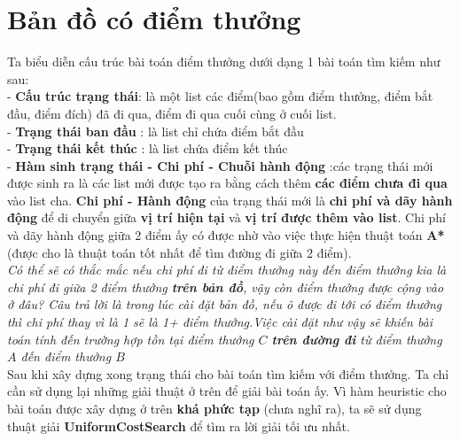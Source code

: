 \documentclass[11pt]{article} %
\begin{document}
\section{Bản đồ có điểm thưởng}
Ta biểu diễn cấu trúc bài toán điểm thưởng dưới dạng 1 bài toán tìm kiếm như sau:\\
- \textbf{Cấu trúc trạng thái}: là một list các điểm(bao gồm điểm thưởng, điểm bắt đầu, điểm đích) đã đi qua, điểm đi qua cuối cùng ở cuối list. \\
- \textbf{Trạng thái ban đầu} : là  list chỉ chứa điểm bắt đầu\\
- \textbf{Trạng thái kết thúc} : là list chứa điểm kết thúc\\
- \textbf{Hàm sinh trạng thái - Chi phí - Chuỗi hành động} :các trạng thái mới được sinh ra là các list mới được tạo ra bằng cách thêm \textbf{các điểm chưa đi qua} vào list cha. \textbf{Chi phí - Hành động} của trạng thái mới là \textbf{chi phí và dãy hành động} để di chuyển giữa \textbf{vị trí hiện tại} và \textbf{vị trí được thêm vào list}. Chi phí và dãy hành động giữa 2 điểm ấy có được nhờ vào việc thực hiện thuật toán \textbf{A*} (được cho là thuật toán tốt nhất để tìm đường đi giữa 2 điểm).\\
\emph{Có thể sẽ có thắc mắc nếu chi phí đi từ điểm thưởng này đến điểm thưởng kia là chi phí đi giữa 2 điểm thưởng \textbf{trên bản đồ}, vậy còn điểm thưởng được cộng vào ở đâu? Câu trả lời là trong lúc cài đặt bản đồ, nếu ô được đi tới có điểm thưởng thì chi phí thay vì là 1 sẽ là 1+ điểm thưởng.Việc cài đặt như vậy sẽ khiến bài toán tính đến trường hợp tồn tại điểm thưởng $C$ \textbf{trên đường đi} từ điểm thưởng $A$ đến điểm thưởng $B$}\\
Sau khi xây dựng xong trạng thái cho bài toán tìm kiếm với điểm thưởng. Ta chỉ cần sử dụng lại những giải thuật ở trên để giải bài toán ấy. Vì hàm heuristic cho bài toán được xây dựng ở trên \textbf{khá phức tạp} (chưa nghĩ ra), ta sẽ sử dụng thuật giải \textbf{UniformCostSearch} để tìm ra lời giải tối ưu nhất.\\
\end{document}

